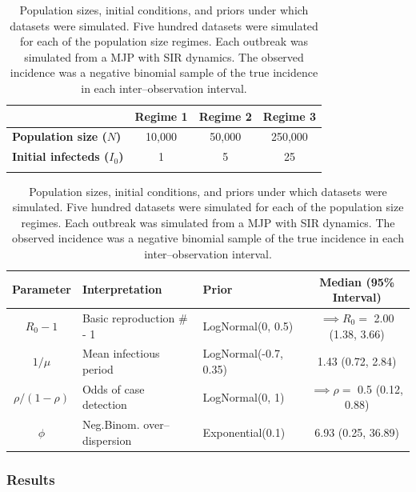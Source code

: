 \begin{table}[htbp]
	\caption[LNA coverage simulation settings.]{Population sizes, initial conditions, and priors under which datasets were simulated. Five hundred datasets were simulated for each of the population size regimes. Each outbreak was simulated from a MJP with SIR dynamics. The observed incidence was a negative binomial sample of the true incidence in each inter--observation interval.}
	\label{tab:lna_coverage_sim}
	\footnotesize
	\centering
	\begin{tabular}{lccc}
		\hline
		& \textbf{Regime 1} & \textbf{Regime 2} & \textbf{Regime 3} \\\hline
		\textbf{Population size ($ N $)} & 10,000 & 50,000 & 250,000 \\ 
		\textbf{Initial infecteds ($ I_0 $)} & 1 & 5 & 25 \\
		\hline
		&&&
	\end{tabular} 

	\begin{tabular}{cllc}
		\hline
		\textbf{Parameter} & \textbf{Interpretation} & \textbf{Prior} & \textbf{Median (95\% Interval)} \\ \hline
		$ R_0-1 $ & Basic reproduction \# - 1 & LogNormal(0, 0.5) & $ \implies R_0 = $ 2.00 (1.38, 3.66) \\ 
		$ 1/\mu $ & Mean infectious period & LogNormal(-0.7, 0.35)& 1.43 (0.72, 2.84) \\
		$ \rho / (1-\rho) $ & Odds of case detection & LogNormal(0, 1) & $ \implies \rho =$ 0.5 (0.12, 0.88) \\
		$ \phi $ & Neg.Binom. over--dispersion & Exponential(0.1) & 6.93 (0.25, 36.89)\\
		\hline
	\end{tabular}
\end{table}

\subsubsection{Results}

